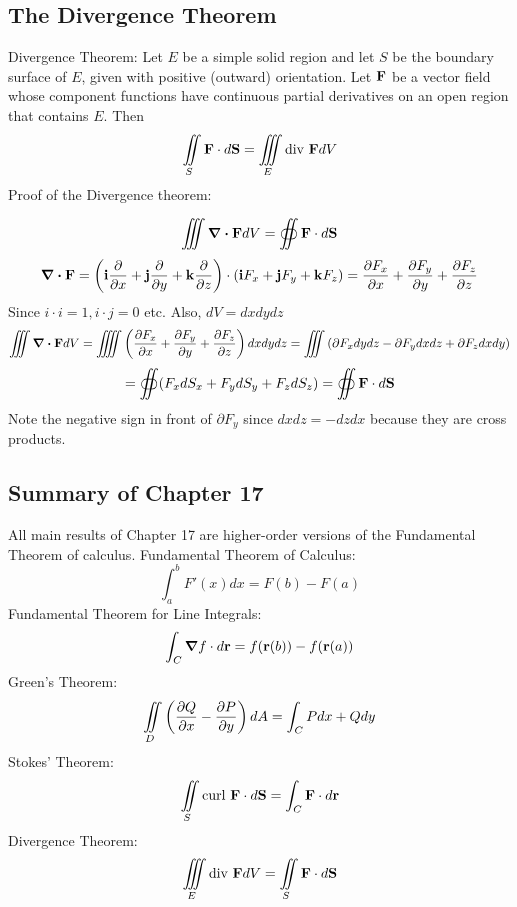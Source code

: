 \documentclass{article}
\begin{document}
    \subsection{The Divergence Theorem}
    \begin{outline}
        \1 Divergence Theorem: Let $E$ be a simple solid region and let $S$ be the boundary surface of $E$, given with positive (outward) orientation. Let \(\vb F\) be a vector field whose component functions have continuous partial derivatives on an open region that contains $E$. Then \[\iint\limits_S\vb F\cdot d\vb S=\iiint\limits_E\text{div }\vb FdV\]
        \1 Proof of the Divergence theorem: 
    \end{outline}
    \[\iiint\div\vb FdV=\oiint\vb F\cdot d\vb S\]
    \[\div\vb F=\left(\vb i\pdv{x}+\vb j\pdv{y}+\vb k\pdv{z}\right)\cdot\left(\vb iF_x+\vb jF_y+\vb kF_z\right)=\pdv{F_x}{x}+\pdv{F_y}{y}+\pdv{F_z}{z}\]
    Since \(i\cdot i=1,i\cdot j=0\) etc. Also, \(dV=dxdydz\)
    \[\iiint\div\vb FdV=\iiiint\left(\pdv{F_x}{x}+\pdv{F_y}{y}+\pdv{F_z}{z}\right)dxdydz=\iiint\left(\partial F_xdydz-\partial F_ydxdz+\partial F_zdxdy\right)\]
    \[=\oiint(F_xdS_x+F_ydS_y+F_zdS_z)=\oiint\vb F\cdot d\vb S\]
    Note the negative sign in front of \(\partial F_y\) since \(dxdz=-dzdx\) because they are cross products. 
    \subsection{Summary of Chapter 17}
    \begin{outline}
        \1 All main results of Chapter 17 are higher-order versions of the Fundamental Theorem of calculus. 
        \1 Fundamental Theorem of Calculus: \[\int^b_aF'(x)dx=F(b)-F(a)\]
        \1 Fundamental Theorem for Line Integrals: \[\int_C\grad f\cdot d\vb r=f(\vb r(b)) - f(\vb r(a))\]
        \1 Green's Theorem: \[\iint\limits_D\left(\pdv{Q}{x}-\pdv{P}{y}\right)dA=\int_CPdx+Qdy\]
        \1 Stokes' Theorem: \[\iint\limits_S\text{curl }\vb F\cdot d\vb S=\int_C\vb F\cdot d\vb r\]
        \1 Divergence Theorem: \[\iiint\limits_E\text{div }\vb FdV=\iint\limits_S\vb F\cdot d\vb S\]
    \end{outline}
\end{document}

